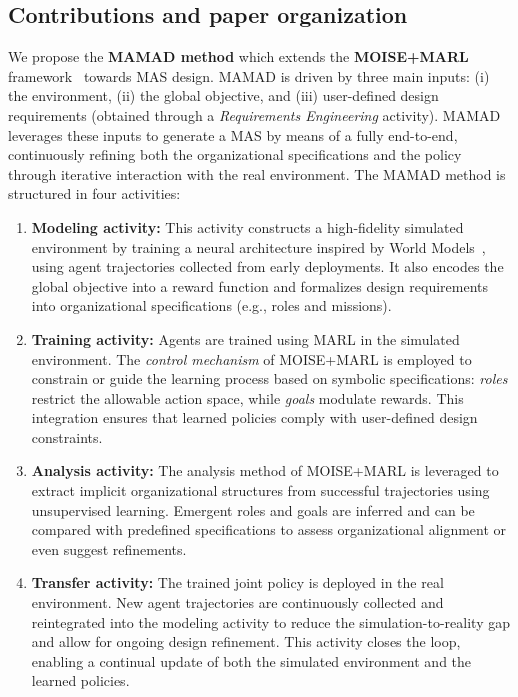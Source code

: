 \documentclass[pdflatex,sn-mathphys-num]{sn-jnl}%
\theoremstyle{thmstyleone}%
\theoremstyle{thmstyletwo}%
\theoremstyle{thmstylethree}%
\begin{document}
\subsection{Contributions and paper organization}

We propose the \textbf{MAMAD method} which extends the \textbf{MOISE+MARL} framework~\cite{soule2025moisemarl} towards MAS design. MAMAD is driven by three main inputs: (i) the environment, (ii) the global objective, and (iii) user-defined design requirements (obtained through a \textit{Requirements Engineering} activity). MAMAD leverages these inputs to generate a MAS by means of a fully end-to-end, continuously refining both the organizational specifications and the policy through iterative interaction with the real environment.
The MAMAD method is structured in four activities:

\begin{enumerate}
    \item \textbf{Modeling activity:} This activity constructs a high-fidelity simulated environment by training a neural architecture inspired by World Models~\cite{Ha2018}, using agent trajectories collected from early deployments. It also encodes the global objective into a reward function and formalizes design requirements into organizational specifications (e.g., roles and missions).
          
    \item \textbf{Training activity:} Agents are trained using MARL in the simulated environment. The \textit{control mechanism} of MOISE+MARL is employed to constrain or guide the learning process based on symbolic specifications: \textit{roles} restrict the allowable action space, while \textit{goals} modulate rewards. This integration ensures that learned policies comply with user-defined design constraints.
          
    \item \textbf{Analysis activity:} The analysis method of MOISE+MARL is leveraged to extract implicit organizational structures from successful trajectories using unsupervised learning. Emergent roles and goals are inferred and can be compared with predefined specifications to assess organizational alignment or even suggest refinements.
          
    \item \textbf{Transfer activity:} The trained joint policy is deployed in the real environment. New agent trajectories are continuously collected and reintegrated into the modeling activity to reduce the simulation-to-reality gap and allow for ongoing design refinement. This activity closes the loop, enabling a continual update of both the simulated environment and the learned policies.
\end{enumerate}
\end{document}
